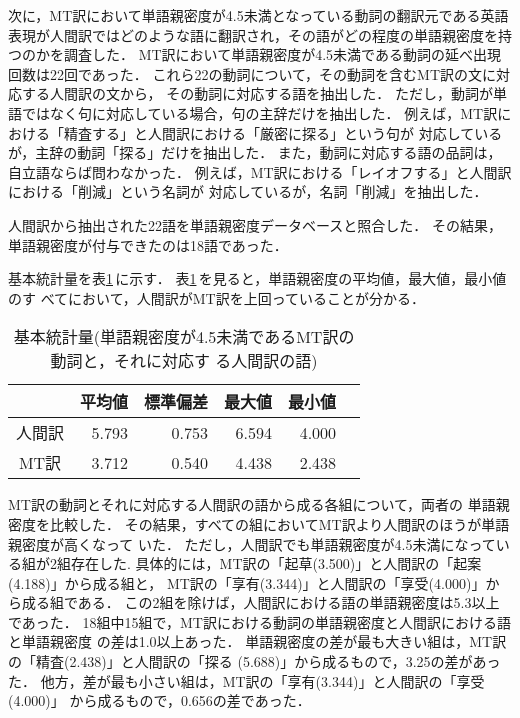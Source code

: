 次に，MT訳において単語親密度が4.5未満となっている動詞の翻訳元である英語
表現が人間訳ではどのような語に翻訳され，その語がどの程度の単語親密度を持
つのかを調査した．
MT訳において単語親密度が4.5未満である動詞の延べ出現回数は22回であった．
これら22の動詞について，その動詞を含むMT訳の文に対応する人間訳の文から，
その動詞に対応する語を抽出した．
ただし，動詞が単語ではなく句に対応している場合，句の主辞だけを抽出した．
例えば，MT訳における「精査する」と人間訳における「厳密に探る」という句が
対応しているが，主辞の動詞「探る」だけを抽出した．
また，動詞に対応する語の品詞は，自立語ならば問わなかった．
例えば，MT訳における「レイオフする」と人間訳における「削減」という名詞が
対応しているが，名詞「削減」を抽出した． 

人間訳から抽出された22語を単語親密度データベースと照合した．
その結果，単語親密度が付与できたのは18語であった．

基本統計量を表\ref{tab:stat-diff}\,に示す．
表\ref{tab:stat-diff}\,を見ると，単語親密度の平均値，最大値，最小値のす
べてにおいて，人間訳がMT訳を上回っていることが分かる．
\begin{table}[htbp]
\caption{基本統計量(単語親密度が4.5未満であるMT訳の動詞と，それに対応す
る人間訳の語)} 
\label{tab:stat-diff}
\begin{center}
\begin{tabular}{|c||r|r|r|r|r|}\hline
 & \multicolumn{1}{c|}{平均値} &
\multicolumn{1}{c|}{標準偏差} & \multicolumn{1}{c|}{最大値} & 
\multicolumn{1}{c|}{最小値} \\\hline\hline
人間訳 & 5.793 & 0.753 & 6.594 & 4.000 \\
MT訳   & 3.712 & 0.540 & 4.438 & 2.438 \\\hline
\end{tabular}
\end{center}
\end{table}

MT訳の動詞とそれに対応する人間訳の語から成る各組について，両者の
単語親密度を比較した． 
その結果，すべての組においてMT訳より人間訳のほうが単語親密度が高くなって
いた．
ただし，人間訳でも単語親密度が4.5未満になっている組が2組存在した.
具体的には，MT訳の「起草(3.500)」と人間訳の「起案(4.188)」から成る組と，
MT訳の「享有(3.344)」と人間訳の「享受(4.000)」から成る組である．
この2組を除けば，人間訳における語の単語親密度は5.3以上であった．
18組中15組で，MT訳における動詞の単語親密度と人間訳における語と単語親密度
の差は1.0以上あった．
単語親密度の差が最も大きい組は，MT訳の「精査(2.438)」と人間訳の「探る
(5.688)」から成るもので，3.25の差があった．
他方，差が最も小さい組は，MT訳の「享有(3.344)」と人間訳の「享受(4.000)」
から成るもので，0.656の差であった．

